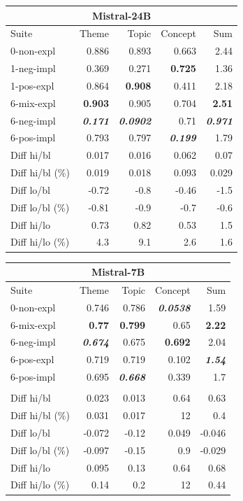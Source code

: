 \begin{table}
    \begin{tabular}{lrrrr}
    \toprule
    \multicolumn{5}{c}{\textbf{Mistral-24B}} \\
    \midrule
    Suite & Theme & Topic & Concept & Sum \\
    \midrule
    0-non-expl & 0.886 & 0.893 & 0.663 & 2.44 \\
    1-neg-impl & 0.369 & 0.271 & \bfseries 0.725 & 1.36 \\
    1-pos-expl & 0.864 & \bfseries 0.908 & 0.411 & 2.18 \\
    6-mix-expl & \bfseries 0.903 & 0.905 & 0.704 & \bfseries 2.51 \\
    6-neg-impl & \bfseries \itshape 0.171 & \bfseries \itshape 0.0902 & 0.71 & \bfseries \itshape 0.971 \\
    6-pos-impl & 0.793 & 0.797 & \bfseries \itshape 0.199 & 1.79 \\
    \midrule
Diff hi/bl & 0.017 & 0.016 & 0.062 & 0.07 \\
Diff hi/bl (\%) & 0.019 & 0.018 & 0.093 & 0.029 \\
Diff lo/bl & -0.72 & -0.8 & -0.46 & -1.5 \\
Diff lo/bl (\%) & -0.81 & -0.9 & -0.7 & -0.6 \\
Diff hi/lo & 0.73 & 0.82 & 0.53 & 1.5 \\
Diff hi/lo (\%) & 4.3 & 9.1 & 2.6 & 1.6 \\
    \bottomrule
    \end{tabular}
    \begin{tabular}{lrrrr}
    \toprule
    \multicolumn{5}{c}{\textbf{Mistral-7B}} \\
    \midrule
    Suite & Theme & Topic & Concept & Sum \\
    \midrule
    0-non-expl & 0.746 & 0.786 & \bfseries \itshape 0.0538 & 1.59 \\
    6-mix-expl & \bfseries 0.77 & \bfseries 0.799 & 0.65 & \bfseries 2.22 \\
    6-neg-impl & \bfseries \itshape 0.674 & 0.675 & \bfseries 0.692 & 2.04 \\
    6-pos-expl & 0.719 & 0.719 & 0.102 & \bfseries \itshape 1.54 \\
    6-pos-impl & 0.695 & \bfseries \itshape 0.668 & 0.339 & 1.7 \\
     & & & & \\
    \midrule
Diff hi/bl & 0.023 & 0.013 & 0.64 & 0.63 \\
Diff hi/bl (\%) & 0.031 & 0.017 & 12 & 0.4 \\
Diff lo/bl & -0.072 & -0.12 & 0.049 & -0.046 \\
Diff lo/bl (\%) & -0.097 & -0.15 & 0.9 & -0.029 \\
Diff hi/lo & 0.095 & 0.13 & 0.64 & 0.68 \\
Diff hi/lo (\%) & 0.14 & 0.2 & 12 & 0.44 \\
    \bottomrule
    \end{tabular}
    

\end{table}
